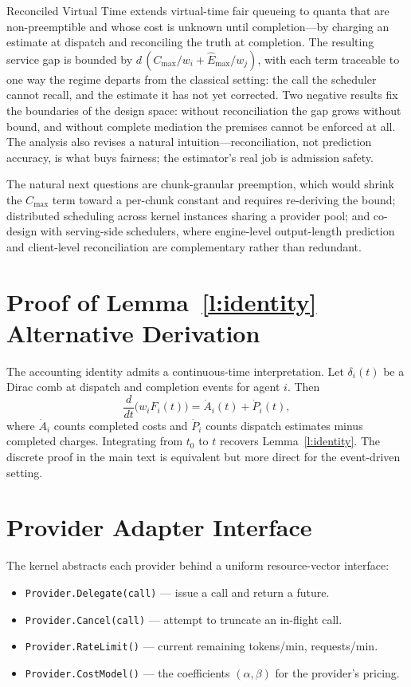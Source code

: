 \documentclass[letterpaper,11pt,leqno]{article}
\newcommand{\bib}{paper.bib}
\begin{document}
Reconciled Virtual Time extends virtual-time fair queueing to quanta that are non-preemptible and whose cost is unknown until completion---by charging an estimate at dispatch and reconciling the truth at completion. The resulting service gap is bounded by $d\,(C_{\max}/w_i + \hat{E}_{\max}/w_j)$, with each term traceable to one way the regime departs from the classical setting: the call the scheduler cannot recall, and the estimate it has not yet corrected. Two negative results fix the boundaries of the design space: without reconciliation the gap grows without bound, and without complete mediation the premises cannot be enforced at all. The analysis also revises a natural intuition---reconciliation, not prediction accuracy, is what buys fairness; the estimator's real job is admission safety.

The natural next questions are chunk-granular preemption, which would shrink the $C_{\max}$ term toward a per-chunk constant and requires re-deriving the bound; distributed scheduling across kernel instances sharing a provider pool; and co-design with serving-side schedulers, where engine-level output-length prediction and client-level reconciliation are complementary rather than redundant.


\appendix

\section{Proof of Lemma~\ref{l:identity} Alternative Derivation}\label{a:identity}

The accounting identity admits a continuous-time interpretation. Let $\delta_i(t)$ be a Dirac comb at dispatch and completion events for agent $i$. Then
\[
  \frac{d}{dt}\bigl(w_i F_i(t)\bigr) = \dot{A}_i(t) + \dot{P}_i(t),
\]
where $\dot{A}_i$ counts completed costs and $\dot{P}_i$ counts dispatch estimates minus completed charges. Integrating from $t_0$ to $t$ recovers Lemma~\ref{l:identity}. The discrete proof in the main text is equivalent but more direct for the event-driven setting.

\section{Provider Adapter Interface}\label{a:provider}

The kernel abstracts each provider behind a uniform resource-vector interface:

\begin{itemize}
\item \texttt{Provider.Delegate(call)} --- issue a call and return a future.
\item \texttt{Provider.Cancel(call)} --- attempt to truncate an in-flight call.
\item \texttt{Provider.RateLimit()} --- current remaining tokens/min, requests/min.
\item \texttt{Provider.CostModel()} --- the coefficients $(\alpha, \beta)$ for the provider's pricing.
\end{itemize}
\end{document}
